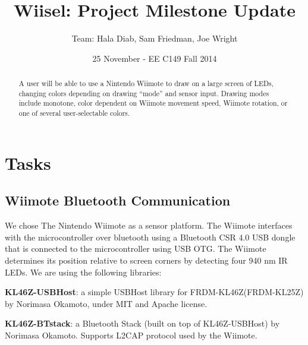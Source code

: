 \documentclass{tufte-handout}
\title{Wiisel: Project Milestone Update}
\author{Team: Hala Diab, Sam Friedman, Joe Wright}
\date{25 November - EE C149 Fall 2014}
\begin{document}
\maketitle
\begin{abstract}
    A user will be able to use a Nintendo Wiimote to draw on a large screen of
LEDs, changing colors depending
on drawing ``mode'' and sensor input. Drawing modes include monotone, color
dependent on Wiimote movement speed, Wiimote rotation, or one of several
user-selectable colors.
\end{abstract}

\section{Tasks}

\subsection{Wiimote Bluetooth Communication}
We chose The Nintendo Wiimote as a sensor platform.
The Wiimote interfaces with the microcontroller over bluetooth using a Bluetooth CSR 4.0 USB dongle that is
connected to the microcontroller using USB OTG.
The Wiimote determines its position relative to screen corners by detecting
four 940 nm IR LEDs. 
We are using the following libraries:

\begin{enumerate*}
    \item
        \textbf{KL46Z-USBHost}:
a simple USBHost library for FRDM-KL46Z(FRDM-KL25Z) by Norimasa Okamoto, under MIT and Apache license.
\item
    \textbf{KL46Z-BTstack}:
a Bluetooth Stack (built on top of KL46Z-USBHost) by Norimasa Okamoto. Supports L2CAP protocol used by the Wiimote.
\end{enumerate*}
\end{document}
